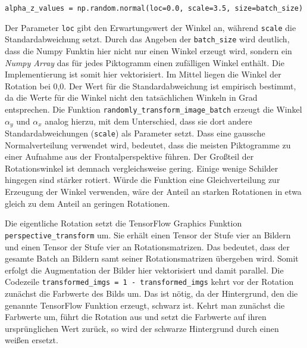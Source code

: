 \begin{code}
   \begin{verbatim}
alpha_z_values = np.random.normal(loc=0.0, scale=3.5, size=batch_size)
\end{verbatim}
   \label{lst:alpha-z-value}
   \end{code}

Der Parameter \texttt{loc} gibt den Erwartungswert der Winkel an, während \texttt{scale} die Standardabweichung setzt. Durch das Angeben der \texttt{batch_size} wird deutlich, dass die Numpy Funktin hier nicht nur einen Winkel erzeugt wird, sondern ein \emph{Numpy Array} das für jedes Piktogramm einen zufälligen Winkel enthält. Die Implementierung ist somit hier vektorisiert. Im Mittel liegen die Winkel der Rotation bei 0,0\textdegree. Der Wert für die Standardabweichung ist empirisch bestimmt, da die Werte für die Winkel nicht den tatsächlichen Winkeln in Grad entsprechen. Die Funktion \texttt{randomly_transform_image_batch} erzeugt die Winkel $\alpha_y$ und $\alpha_x$ analog hierzu, mit dem Unterschied, dass sie dort andere Standardabweichungen (\texttt{scale}) als Parameter setzt. Dass eine gaussche Normalverteilung verwendet wird, bedeutet, dass die meisten Piktogramme zu einer Aufnahme aus der Frontalperspektive führen. Der Großteil der Rotationswinkel ist demnach vergleichsweise gering. Einige wenige Schilder hingegen sind stärker rotiert. Würde die Funktion eine Gleichverteilung zur Erzeugung der Winkel verwenden, wäre der Anteil an starken Rotationen in etwa gleich zu dem Anteil an geringen Rotationen.

Die eigentliche Rotation setzt die TensorFlow Graphics Funktion \texttt{perspective_transform} um. Sie erhält einen Tensor der Stufe vier an Bildern und einen Tensor der Stufe vier an Rotationsmatrizen. Das bedeutet, dass der gesamte Batch an Bildern samt seiner Rotationsmatrizen übergeben wird. Somit erfolgt die Augmentation der Bilder hier vektorisiert und damit parallel. Die Codezeile \texttt{transformed_imgs = 1 - transformed_imgs} kehrt vor der Rotation zunächst die Farbwerte des Bilds um. Das ist nötig, da der Hintergrund, den die genannte TensorFlow Funktion erzeugt, schwarz ist. Kehrt man zunächst die Farbwerte um, führt die Rotation aus und setzt die Farbwerte auf ihren ursprünglichen Wert zurück, so wird der schwarze Hintergrund durch einen weißen ersetzt.